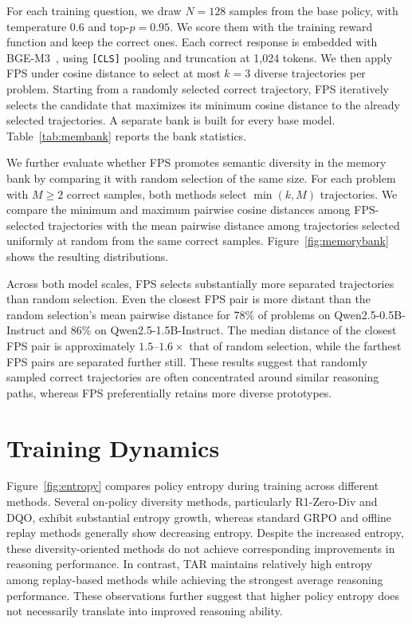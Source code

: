 \documentclass[11pt]{article}
\newcommand{\model}{\textsc{TAR}\xspace}
\begin{document}
For each training question, we draw $N=128$ samples from the base policy, with temperature $0.6$ and top-$p=0.95$.
We score them with the training reward function and keep the correct ones.
Each correct response is embedded with BGE-M3~\cite{chen2024bge}, using \texttt{[CLS]} pooling and truncation at 1,024 tokens.
We then apply FPS under cosine distance to select at most $k=3$ diverse trajectories per problem.
Starting from a randomly selected correct trajectory, FPS iteratively selects the candidate that maximizes its minimum cosine distance to the already selected trajectories.
A separate bank is built for every base model.
Table~\ref{tab:membank} reports the bank statistics.

We further evaluate whether FPS promotes semantic diversity in the memory bank by comparing it with random selection of the same size.
For each problem with $M\geq 2$ correct samples, both methods select $\min(k,M)$ trajectories.
We compare the minimum and maximum pairwise cosine distances among FPS-selected trajectories with the mean pairwise distance among trajectories selected uniformly at random from the same correct samples.
Figure~\ref{fig:memorybank} shows the resulting distributions.

Across both model scales, FPS selects substantially more separated trajectories than random selection.
Even the closest FPS pair is more distant than the random selection's mean pairwise distance for 78\% of problems on Qwen2.5-0.5B-Instruct and 86\% on Qwen2.5-1.5B-Instruct.
The median distance of the closest FPS pair is approximately $1.5$--$1.6\times$ that of random selection, while the farthest FPS pairs are separated further still.
These results suggest that randomly sampled correct trajectories are often concentrated around similar reasoning paths, whereas FPS preferentially retains more diverse prototypes.

\section{Training Dynamics}\label{app:dynamic}

Figure~\ref{fig:entropy} compares policy entropy during training across different methods.
Several on-policy diversity methods, particularly R1-Zero-Div and DQO, exhibit substantial entropy growth, whereas standard GRPO and offline replay methods generally show decreasing entropy.
Despite the increased entropy, these diversity-oriented methods do not achieve corresponding improvements in reasoning performance.
In contrast, \model maintains relatively high entropy among replay-based methods while achieving the strongest average reasoning performance.
These observations further suggest that higher policy entropy does not necessarily translate into improved reasoning ability.
\end{document}
